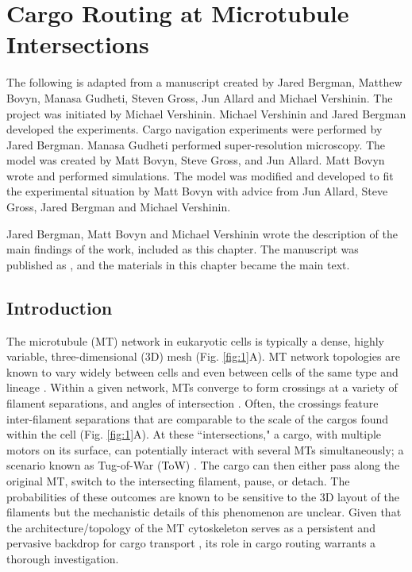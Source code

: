 \chapter{Cargo Routing at Microtubule Intersections} \label{sec:maintext}

The following is adapted from a manuscript created by Jared Bergman, Matthew Bovyn, Manasa Gudheti, Steven Gross, Jun Allard and Michael Vershinin. The project was initiated by Michael Vershinin. Michael Vershinin and Jared Bergman developed the experiments. Cargo navigation experiments were performed by Jared Bergman. Manasa Gudheti performed super-resolution microscopy. The model was created by Matt Bovyn, Steve Gross, and Jun Allard. Matt Bovyn wrote and performed simulations. The model was modified and developed to fit the experimental situation by Matt Bovyn with advice from Jun Allard, Steve Gross, Jared Bergman and Michael Vershinin. 

Jared Bergman, Matt Bovyn and Michael Vershinin wrote the description of the main findings of the work, included as this chapter. The manuscript was published as \cite{Bergman2018}, and the materials in this chapter became the main text.

\section{Introduction}

The microtubule (MT) network in eukaryotic cells is typically a dense, highly variable, three-dimensional (3D) mesh (Fig. \ref{fig:1}A). MT network topologies are known to vary widely between cells \cite{Schnorrenberg2016} and even between cells of the same type and lineage \cite{Dong2015}. Within a given network, MTs converge to form crossings at a variety of filament separations, and angles of intersection \cite{Huang2008}. Often, the crossings feature inter-filament separations that are comparable to the scale of the cargos found within the cell (Fig. \ref{fig:1}A). At these ``intersections," a cargo, with multiple motors on its surface, can potentially interact with several MTs simultaneously; a scenario known as Tug-of-War (ToW) \cite{Muller2008,Osunbayo2015}. The cargo can then either pass along the original MT, switch to the intersecting filament, pause, or detach. The probabilities of these outcomes are known to be sensitive to the 3D layout of the filaments \cite{Balint2013,Ross2008,Erickson2013} but the mechanistic details of this phenomenon are unclear. Given that the architecture/topology of the MT cytoskeleton serves as a persistent and pervasive backdrop for cargo transport \cite{Verdeny-Vilanova2017}, its role in cargo routing warrants a thorough investigation.

